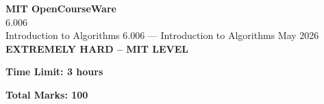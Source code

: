 \documentclass[12pt,a4paper]{exam}
\begin{document}
\begin{center}
{\LARGE \textbf{MIT OpenCourseWare}}\\6.006\\Introduction to Algorithms
\vspace{0.5cm}
{6.006} --- {Introduction to Algorithms}
\vspace{0.3cm}
May 2026
\vspace{0.3cm}
\textbf{EXTREMELY HARD -- MIT LEVEL}
\end{center}

\begin{center}
\textbf{Time Limit: 3 hours}
\end{center}

\begin{center}
\textbf{Total Marks: 100}
\end{center}

\vspace{0.5cm}
\end{document}
